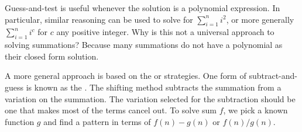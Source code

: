 Guess-and-test is useful whenever the solution is a polynomial
expression.
In particular, similar reasoning can be used to solve for
\(\sum_{i=1}^n i^2\), or more generally \(\sum_{i=1}^n i^c\) for \(c\)
any positive integer.
Why is this not a universal approach to solving summations?
Because many summations do not have a polynomial as their closed
form solution.

A more general approach is based on the
 or  strategies.
One form of subtract-and-guess is known as the
. 
The shifting method subtracts the summation from a variation on the
summation.
The variation selected for the subtraction should be one that makes
most of the terms cancel out.
To solve sum \(f\), we pick a known function \(g\) and find a pattern in
terms of \(f(n) - g(n)\) or \(f(n)/g(n)\).

